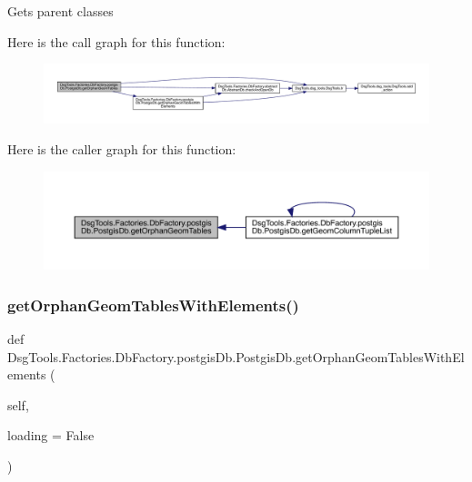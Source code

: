 \begin{DoxyVerb}Gets parent classes
\end{DoxyVerb}
 Here is the call graph for this function\+:
\nopagebreak
\begin{figure}[H]
\begin{center}
\leavevmode
\includegraphics[width=350pt]{class_dsg_tools_1_1_factories_1_1_db_factory_1_1postgis_db_1_1_postgis_db_aae3059a8f801efd4da98bbd3ebbff1c7_cgraph}
\end{center}
\end{figure}
Here is the caller graph for this function\+:
\nopagebreak
\begin{figure}[H]
\begin{center}
\leavevmode
\includegraphics[width=350pt]{class_dsg_tools_1_1_factories_1_1_db_factory_1_1postgis_db_1_1_postgis_db_aae3059a8f801efd4da98bbd3ebbff1c7_icgraph}
\end{center}
\end{figure}
\mbox{\label{class_dsg_tools_1_1_factories_1_1_db_factory_1_1postgis_db_1_1_postgis_db_abb82aa10c5652a8c38442a4c15d8eeba}} 
\subsubsection{\texorpdfstring{get\+Orphan\+Geom\+Tables\+With\+Elements()}{getOrphanGeomTablesWithElements()}}
{\footnotesize\ttfamily def Dsg\+Tools.\+Factories.\+Db\+Factory.\+postgis\+Db.\+Postgis\+Db.\+get\+Orphan\+Geom\+Tables\+With\+Elements (\begin{DoxyParamCaption}\item[{}]{self,  }\item[{}]{loading = {\ttfamily False} }\end{DoxyParamCaption})}

